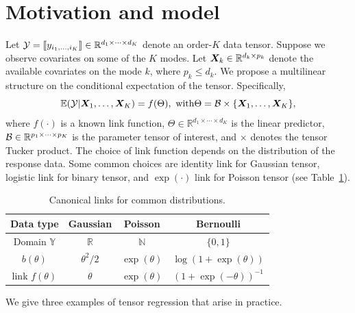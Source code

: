 \documentclass{article}
\theoremstyle{plain}
\theoremstyle{definition}
\begin{document}
\section{Motivation and model}\label{sec:model}
Let $\mathcal{Y}=\llbracket y_{i_1,\ldots,i_K} \rrbracket\in\mathbb{R}^{d_1\times \cdots\times d_K}$ denote an order-$K$ data tensor. Suppose we observe covariates on some of the $K$ modes. Let $\bm X_k\in\mathbb{R}^{d_k\times p_k}$ denote the available covariates on the mode $k$, where $p_k\leq d_k$. We propose a multilinear structure on the conditional expectation of the tensor. Specifically, 
\begin{equation}\label{eq:tensormodel}
\mathbb{E}(\mathcal{Y}|\bm X_1,\ldots,\bm X_K)=f(\Theta),\ \text{with}
\Theta =\mathcal{B}\times\{\bm X_1,\ldots,\bm X_K\} ,
\end{equation}
where $f(\cdot)$ is a known link function, $\Theta\in\mathbb{R}^{d_1\times \cdots\times d_K}$ is the linear predictor, $\mathcal{B}\in\mathbb{R}^{p_1\times \cdots \times p_K}$ is the parameter tensor of interest, and $\times$ denotes the tensor Tucker product. The choice of link function depends on the distribution of the response data. Some common choices are identity link for Gaussian tensor, logistic link for binary tensor, and $\exp(\cdot)$ link for Poisson tensor (see Table~\ref{table:link}). 

\begin{table}
\centering
\begin{tabular}{c|ccc}
Data type &Gaussian & Poisson& Bernoulli\\
\hline
Domain $\mathbb{Y}$& $\mathbb{R}$&$\mathbb{N}$&$\{0,1\}$\\
 $b(\theta)$&$\theta^2/2$& $\exp(\theta)$&$\log (1+\exp(\theta))$\\
 link $f(\theta)$&$\theta$&$\exp(\theta)$&$(1+\exp(-\theta))^{-1}$
\end{tabular}
\vspace{.2cm}
\caption{Canonical links for common distributions.}\label{table:link}
\vspace{-.6cm}
\end{table}


We give three examples of tensor regression that arise in practice.
\end{document}
